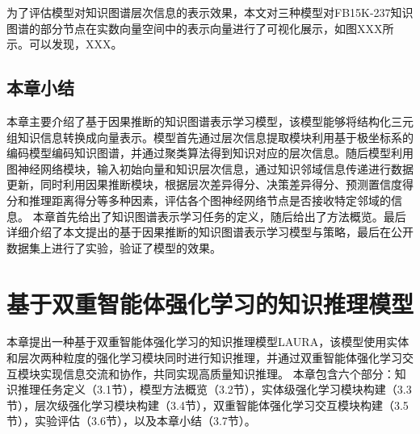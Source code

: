 \documentclass[algorithmlist, AutoFakeBold, AutoFakeSlant, figurelist, tablelist, nomlist, masters]{seuthesix}
\begin{document}
为了评估模型对知识图谱层次信息的表示效果，本文对三种模型对FB15K-237知识图谱的部分节点在实数向量空间中的表示向量进行了可视化展示，如图XXX所示。可以发现，XXX。

\section{本章小结}
本章主要介绍了基于因果推断的知识图谱表示学习模型，该模型能够将结构化三元组知识信息转换成向量表示。模型首先通过层次信息提取模块利用基于极坐标系的编码模型编码知识图谱，并通过聚类算法得到知识对应的层次信息。随后模型利用图神经网络模块，输入初始向量和知识层次信息，通过知识邻域信息传递进行数据更新，同时利用因果推断模块，根据层次差异得分、决策差异得分、预测置信度得分和推理距离得分等多种因素，评估各个图神经网络节点是否接收特定邻域的信息。
本章首先给出了知识图谱表示学习任务的定义，随后给出了方法概览。最后详细介绍了本文提出的基于因果推断的知识图谱表示学习模型与策略，最后在公开数据集上进行了实验，验证了模型的效果。


\chapter{基于双重智能体强化学习的知识推理模型}
本章提出一种基于双重智能体强化学习的知识推理模型LAURA，该模型使用实体和层次两种粒度的强化学习模块同时进行知识推理，并通过双重智能体强化学习交互模块实现信息交流和协作，共同实现高质量知识推理。
本章包含六个部分：知识推理任务定义（3.1节），模型方法概览（3.2节），实体级强化学习模块构建（3.3节），层次级强化学习模块构建（3.4节），双重智能体强化学习交互模块构建（3.5节），实验评估（3.6节），以及本章小结（3.7节）。
\end{document}
